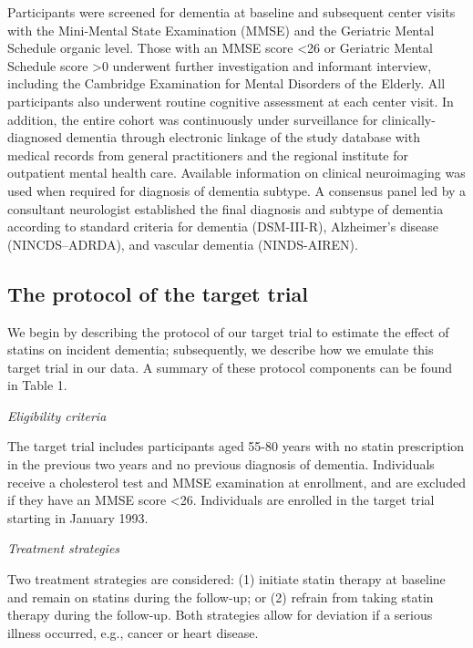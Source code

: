 \documentclass[
]{book}
\begin{document}
Participants were screened for dementia at baseline and subsequent center visits with the Mini-Mental State Examination (MMSE) and the Geriatric Mental Schedule organic level\autocite{debruijn2015}. Those with an MMSE score \textless26 or Geriatric Mental Schedule score \textgreater0 underwent further investigation and informant interview, including the Cambridge Examination for Mental Disorders of the Elderly. All participants also underwent routine cognitive assessment at each center visit. In addition, the entire cohort was continuously under surveillance for clinically-diagnosed dementia through electronic linkage of the study database with medical records from general practitioners and the regional institute for outpatient mental health care. Available information on clinical neuroimaging was used when required for diagnosis of dementia subtype. A consensus panel led by a consultant neurologist established the final diagnosis and subtype of dementia according to standard criteria for dementia (DSM-III-R), Alzheimer's disease (NINCDS--ADRDA), and vascular dementia (NINDS-AIREN).

\hypertarget{the-protocol-of-the-target-trial}{%
\subsection{The protocol of the target trial}\label{the-protocol-of-the-target-trial}}

We begin by describing the protocol of our target trial to estimate the effect of statins on incident dementia; subsequently, we describe how we emulate this target trial in our data. A summary of these protocol components can be found in Table 1.

\emph{Eligibility criteria}

The target trial includes participants aged 55-80 years with no statin prescription in the previous two years and no previous diagnosis of dementia. Individuals receive a cholesterol test and MMSE examination at enrollment, and are excluded if they have an MMSE score \textless26. Individuals are enrolled in the target trial starting in January 1993.

\emph{Treatment strategies}

Two treatment strategies are considered: (1) initiate statin therapy at baseline and remain on statins during the follow-up; or (2) refrain from taking statin therapy during the follow-up. Both strategies allow for deviation if a serious illness occurred, e.g., cancer or heart disease.
\end{document}
